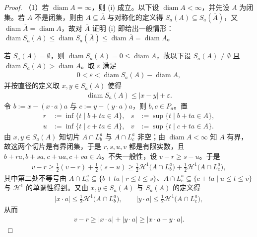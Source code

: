 \documentclass[../../main.tex]{subfiles}%
\begin{document}
\begin{proof}
（1）若 $\operatorname{diam}A=\infty$，则 (i) 成立。以下设 $\operatorname{diam}A<\infty$，并先设 $A$ 为闭集。若 $A$ 不是闭集，则由 $A\subseteq\overline A$ 与对称化的定义得 $S_a(A)\subseteq S_a(\overline A)$，又 $\operatorname{diam}\overline A=\operatorname{diam}A$，故对 $\overline A$ 证明 (i) 即给出一般情形：$\operatorname{diam}S_a(A)\leqslant\operatorname{diam}S_a(\overline A)\leqslant\operatorname{diam}\overline A=\operatorname{diam}A$。

若 $S_a(A)=\emptyset$，则 $\operatorname{diam}S_a(A)=0\leqslant\operatorname{diam}A$，故以下设 $S_a(A)\neq\emptyset$ 且 $\operatorname{diam}S_a(A)>\operatorname{diam}A$。取 $\varepsilon$ 满足
\begin{align*}
0<\varepsilon<\operatorname{diam}S_a(A)-\operatorname{diam}A,
\end{align*}
并按直径的定义取 $x,y\in S_a(A)$ 使得
\begin{align*}
\operatorname{diam}S_a(A)\leqslant|x-y|+\varepsilon .
\end{align*}
令 $b:=x-(x\cdot a)a$ 与 $c:=y-(y\cdot a)a$，则 $b,c\in P_a$。置
\begin{align*}
r&:=\inf\{t\mid b+ta\in A\}, & s&:=\sup\{t\mid b+ta\in A\},\\
u&:=\inf\{t\mid c+ta\in A\}, & v&:=\sup\{t\mid c+ta\in A\}.
\end{align*}
由 $x,y\in S_a(A)$ 知切片 $A\cap L_b^a$ 与 $A\cap L_c^a$ 非空；由 $\operatorname{diam}A<\infty$ 知 $A$ 有界，故这两个切片是有界闭集，于是 $r,s,u,v$ 都是有限实数，且 $b+ra,b+sa,c+ua,c+va\in A$。不失一般性，设 $v-r\geqslant s-u$。于是
\begin{align*}
v-r\geqslant\frac{1}{2}(v-r)+\frac{1}{2}(s-u)
\geqslant\frac{1}{2}\mathcal{H}^1\bigl(A\cap L_b^a\bigr)+\frac{1}{2}\mathcal{H}^1\bigl(A\cap L_c^a\bigr),
\end{align*}
其中第二处不等号由 $A\cap L_b^a\subseteq\{b+ta\mid r\leqslant t\leqslant s\}$、$A\cap L_c^a\subseteq\{c+ta\mid u\leqslant t\leqslant v\}$ 与 $\mathcal{H}^1$ 的单调性得到。又由 $x,y\in S_a(A)$ 与 $S_a(A)$ 的定义得
\begin{align*}
|x\cdot a|\leqslant\frac{1}{2}\mathcal{H}^1\bigl(A\cap L_b^a\bigr),\qquad
|y\cdot a|\leqslant\frac{1}{2}\mathcal{H}^1\bigl(A\cap L_c^a\bigr),
\end{align*}
从而
\begin{align*}
v-r\geqslant|x\cdot a|+|y\cdot a|\geqslant|x\cdot a-y\cdot a| .

\end{align*}
\end{proof}
\end{document}
